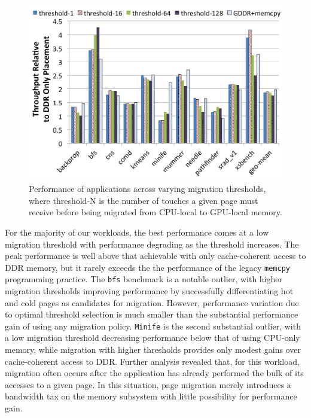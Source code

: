 \begin{figure}[t]
    \includegraphics[width=\columnwidth]{hpca2015/figures/staticthreshold.png} 
    \caption{Performance of applications across varying migration thresholds, where threshold-N is the number of touches a given page must receive
    before being migrated from CPU-local to GPU-local memory.}
    \label{fig:threshold}
\end{figure}

For the majority of our workloads, the best performance comes at a low migration threshold
with performance degrading as the threshold increases.  The peak performance is well above that achievable with 
only cache-coherent access to DDR memory, but it rarely exceeds the the
performance of the legacy {\tt memcpy} programming
practice. The {\tt bfs} benchmark is a notable outlier, with higher migration thresholds improving performance by successfully differentiating hot
and cold pages as candidates for migration.  However, performance variation due to
optimal threshold selection is much smaller than the substantial performance gain of using any migration policy.  {\tt Minife}
is the second substantial outlier, with a low migration threshold decreasing performance below that of using CPU-only
memory, while migration with higher thresholds provides only modest gains over  cache-coherent access to DDR\@. Further analysis revealed 
that, for this workload, migration often occurs after the application has already performed the bulk of its accesses to a given
page.  In this situation, page migration merely introduces a bandwidth tax on the memory subsystem with little possibility for
performance gain.  

